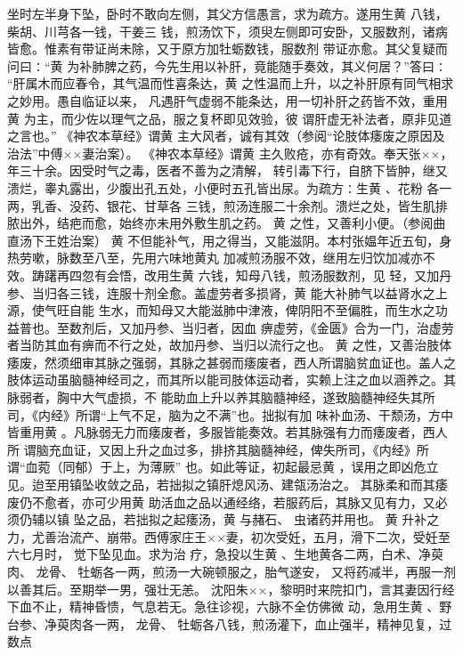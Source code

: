 \documentclass[a4paper,12pt,UTF8,twoside]{ctexbook}
\begin{document}
坐时左半身下坠，卧时不敢向左侧，其父方信愚言，求为疏方。遂用生黄 八钱，柴胡、川芎各一钱，干姜三 
钱，煎汤饮下，须臾左侧即可安卧，又服数剂，诸病皆愈。惟素有带证尚未除，又于原方加牡蛎数钱，服数剂 
带证亦愈。其父复疑而问曰∶“黄 为补肺脾之药，今先生用以补肝，竟能随手奏效，其义何居？”答曰∶ 
“肝属木而应春令，其气温而性喜条达，黄 之性温而上升，以之补肝原有同气相求之妙用。愚自临证以来， 
凡遇肝气虚弱不能条达，用一切补肝之药皆不效，重用黄 为主，而少佐以理气之品，服之复杯即见效验，彼 
谓肝虚无补法者，原非见道之言也。” 
《神农本草经》谓黄 主大风者，诚有其效（参阅“论肢体痿废之原因及治法”中傅××妻治案）。 
《神农本草经》谓黄 主久败疮，亦有奇效。奉天张××，年三十余。因受时气之毒，医者不善为之清解， 
转引毒下行，自脐下皆肿，继又溃烂，睾丸露出，少腹出孔五处，小便时五孔皆出尿。为疏方∶生黄 、花粉 
各一两，乳香、没药、银花、甘草各 
三钱，煎汤连服二十余剂。溃烂之处，皆生肌排脓出外，结疤而愈，始终亦未用外敷生肌之药。 
黄 之性，又善利小便。（参阅曲直汤下王姓治案） 
黄 不但能补气，用之得当，又能滋阴。本村张媪年近五旬，身热劳嗽，脉数至八至，先用六味地黄丸 
加减煎汤服不效，继用左归饮加减亦不效。踌躇再四忽有会悟，改用生黄 六钱，知母八钱，煎汤服数剂，见 
轻，又加丹参、当归各三钱，连服十剂全愈。盖虚劳者多损肾，黄 能大补肺气以益肾水之上源，使气旺自能 
生水，而知母又大能滋肺中津液，俾阴阳不至偏胜，而生水之功益普也。至数剂后，又加丹参、当归者，因血 
痹虚劳，《金匮》合为一门，治虚劳者当防其血有痹而不行之处，故加丹参、当归以流行之也。 
黄 之性，又善治肢体痿废，然须细审其脉之强弱，其脉之甚弱而痿废者，西人所谓脑贫血证也。盖人之 
肢体运动虽脑髓神经司之，而其所以能司肢体运动者，实赖上注之血以涵养之。其脉弱者，胸中大气虚损，不 
能助血上升以养其脑髓神经，遂致脑髓神经失其所司，《内经》所谓“上气不足，脑为之不满”也。拙拟有加 
味补血汤、干颓汤，方中皆重用黄 。凡脉弱无力而痿废者，多服皆能奏效。若其脉强有力而痿废者，西人所 
谓脑充血证，又因上升之血过多，排挤其脑髓神经，俾失所司，《内经》所谓“血菀（同郁）于上，为薄厥” 
也。如此等证，初起最忌黄 ，误用之即凶危立见。迨至用镇坠收敛之品，若拙拟之镇肝熄风汤、建瓴汤治之。 
其脉柔和而其痿废仍不愈者，亦可少用黄 助活血之品以通经络，若服药后，其脉又见有力，又必须仍辅以镇 
坠之品，若拙拟之起痿汤，黄 与赭石、 虫诸药并用也。 
黄 升补之力，尤善治流产、崩带。西傅家庄王××妻，初次受妊，五月，滑下二次，受妊至六七月时， 
觉下坠见血。求为治 
疗，急投以生黄 、生地黄各二两，白术、净萸肉、 龙骨、 牡蛎各一两，煎汤一大碗顿服之，胎气遂安， 
又将药减半，再服一剂以善其后。至期举一男，强壮无恙。 
沈阳朱××，黎明时来院扣门，言其妻因行经下血不止，精神昏愦，气息若无。急往诊视，六脉不全仿佛微 
动，急用生黄 、野台参、净萸肉各一两， 龙骨、 牡蛎各八钱，煎汤灌下，血止强半，精神见复，过数点 
\end{document}
